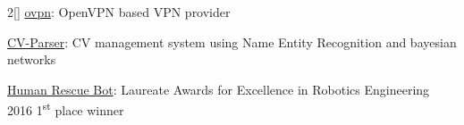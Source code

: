 \documentclass[a4paper, 12pt]{article}
\newenvironment{myparacol}[2][]{%
\begin{paracol}{#2}[#1]\setlength{\parindent}{0pt}}{%
\end{paracol}}
\begin{document}
\begin{sloppypar}
\begin{myparacol}{2}
    \href{https://vpn.hugofs.com}{ovpn}: OpenVPN based VPN provider

    \href{https://github.com/hugo19941994/CV-Parser}{CV-Parser}: CV management system using Name Entity Recognition and bayesian networks

    \href{https://github.com/hugo19941994/robot}{Human Rescue Bot}: Laureate Awards for Excellence in Robotics Engineering 2016 1\textsuperscript{st} place winner

\end{myparacol}
\end{sloppypar}
\end{document}

